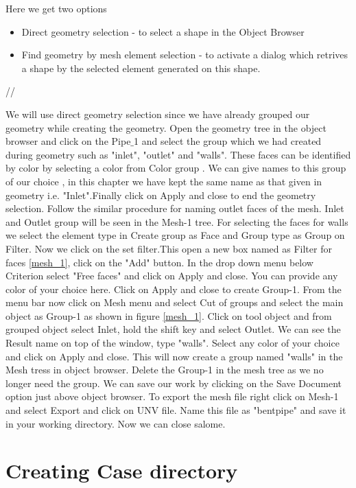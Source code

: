 Here we get two options
\begin{itemize}
\item Direct geometry selection - to select a shape in the Object Browser 
\item Find geometry by mesh element selection - to activate a dialog which retrives a shape by the selected element generated on this shape.
\end{itemize} //

We will use direct geometry selection since we have already grouped our geometry while creating the geometry. Open the geometry tree in the object browser and click on the Pipe$\_$1 and select the group which we had created during geometry such as "inlet", "outlet" and "walls". These faces can be identified by color by selecting a color from Color group . We can give names to this group of our choice , in this chapter we have kept the same name as that given in geometry i.e. "Inlet".Finally click on Apply and close to end the geometry selection. Follow the similar procedure for naming outlet faces of the mesh. Inlet and Outlet group will be seen in the Mesh-1 tree. For selecting the faces for walls we select the element type in Create group as Face and Group type as Group on Filter. Now we click on the set filter.This open a new box named as Filter for faces \ref{mesh_1}, click on the "Add" button. In the drop down menu below Criterion select "Free faces" and click on Apply and close. You can provide any color of your choice here. Click on Apply and close to create Group-1. From the menu bar now click on Mesh menu and select Cut of groups and select the main object as Group-1 as shown in figure \ref{mesh_1}. Click on tool object and from grouped object select Inlet, hold the shift key and select Outlet. We can see the Result name on top of the window, type "walls". Select any color of your choice and click on Apply and close. This will now create a group named "walls" in the Mesh tress in object browser. Delete the Group-1 in the mesh tree as we no longer need the group. We can save our work by clicking on the Save Document option just above object browser. To export the mesh file right click on Mesh-1 and select Export and click on UNV file. Name this file as "bentpipe" and save it in your working directory. Now we can close salome.

\section{Creating Case directory}

